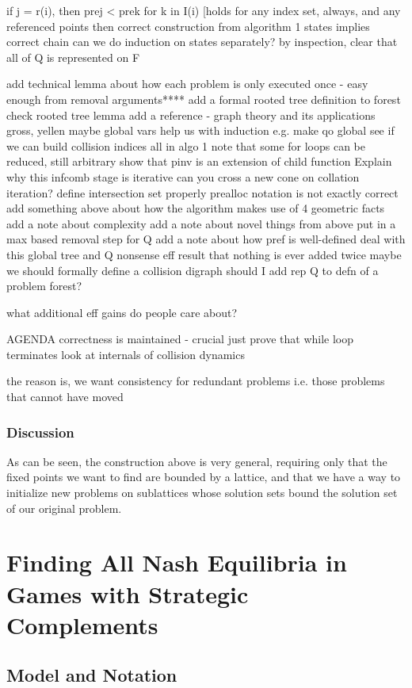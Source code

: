 \documentclass[11pt,reqno]{amsart}
\theoremstyle{definition}
\numberwithin{equation}{section}
\begin{document}
\begin{enumerate}
if j = r(i), then prej <  prek for k in I(i) [holds for any index set, always, and any referenced points 
then correct construction from algorithm 1 states implies correct chain 
can we do induction on states separately? 
by inspection, clear that all of Q is represented on F

add technical lemma about how each problem is only executed once - easy enough from removal arguments****
add a formal rooted tree definition to forest 
check rooted tree lemma 
add a reference - graph theory and its applications gross, yellen
maybe global vars help us with induction e.g. make qo global 
see if we can build collision indices all in algo 1 
note that some for loops can be reduced, still arbitrary
show that pinv is an extension of child function 
Explain why this infcomb stage is iterative 
can you cross a new cone on collation iteration? 
define intersection set properly
prealloc notation is not exactly correct
add something above about how the algorithm makes use of 4 geometric facts 
add a note about complexity 
add a note about novel things from above
put in a max based removal step for Q
add a note about how pref is well-defined 
deal with this global tree and Q nonsense
eff result that nothing is ever added twice
maybe we should formally define a collision digraph 
should I add rep Q to defn of a problem forest? 

what additional eff gains do people care about? 

AGENDA
correctness is maintained - crucial 
just prove that while loop terminates 
look at internals of collision dynamics

the reason is, we want consistency for redundant problems i.e. those problems that cannot have moved 

\subsubsection{Discussion}
As can be seen, the construction above is very general, requiring only that the fixed points we want to find are bounded by a lattice, and that we have a way to initialize new problems on sublattices whose solution sets bound the solution set of our original problem. 

\section{Finding All Nash Equilibria in Games with Strategic Complements}
\subsection{Model and Notation}






\end{enumerate}
\end{document}
